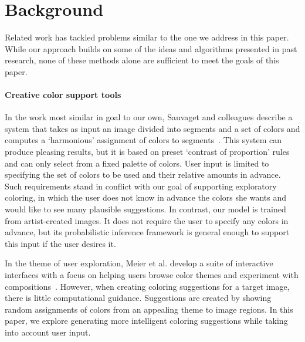 \section{Background}
\label{sec:background}

Related work has tackled problems similar to the one we address in this paper. While our approach builds on some of the ideas and algorithms presented in past research, none of these methods alone are sufficient to meet the goals of this paper.

\paragraph{Creative color support tools}
In the work most similar in goal to our own, Sauvaget and colleagues describe a system that takes as input an image divided into segments and a set of colors and computes a `harmonious' assignment of colors to segments~. This system can produce pleasing results, but it is based on preset `contrast of proportion' rules and can only select from a fixed palette of colors. User input is limited to specifying the set of colors to be used and their relative amounts in advance. Such requirements stand in conflict with our goal of supporting exploratory coloring, in which the user does not know in advance the colors she wants and would like to see many plausible suggestions. In contrast, our model is trained from artist-created images. It does not require the user to specify any colors in advance, but its probabilistic inference framework is general enough to support this input if the user desires it.

In the theme of user exploration, Meier et al. develop a suite of interactive interfaces with a focus on helping users browse color themes and experiment with compositions~. However, when creating coloring suggestions for a target image, there is little computational guidance. Suggestions are created by showing random assignments of colors from an appealing theme to image regions. In this paper, we explore generating more intelligent coloring suggestions while taking into account user input.

